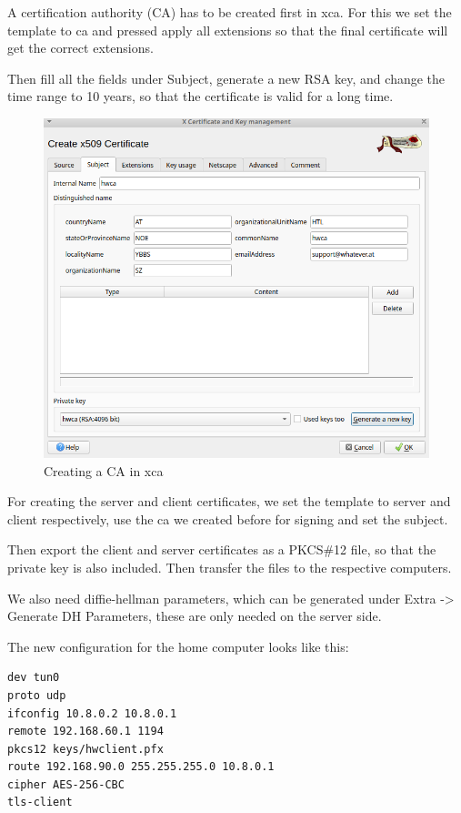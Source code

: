 
A certification authority (CA) has to be created first in xca. For this we set the template to ca and pressed apply all extensions so that the final certificate will get the correct extensions.

Then fill all the fields under Subject, generate a new RSA key, and change the time range to 10 years, so that the certificate is valid for a long time.

\begin{figure}[H]
	\centering
	\includegraphics[width=0.8\linewidth]{Figures/create-ca.png}
	\caption{Creating a CA in xca}
\end{figure}

For creating the server and client certificates, we set the template to server and client respectively, use the ca we created before for signing and set the subject.

Then export the client and server certificates as a PKCS\#12 file, so that the private key is also included. Then transfer the files to the respective computers.

We also need diffie-hellman parameters, which can be generated under Extra -> Generate DH Parameters, these are only needed on the server side.

The new configuration for the home computer looks like this:

\begin{verbatim}
dev tun0
proto udp
ifconfig 10.8.0.2 10.8.0.1
remote 192.168.60.1 1194
pkcs12 keys/hwclient.pfx
route 192.168.90.0 255.255.255.0 10.8.0.1
cipher AES-256-CBC
tls-client
\end{verbatim}

